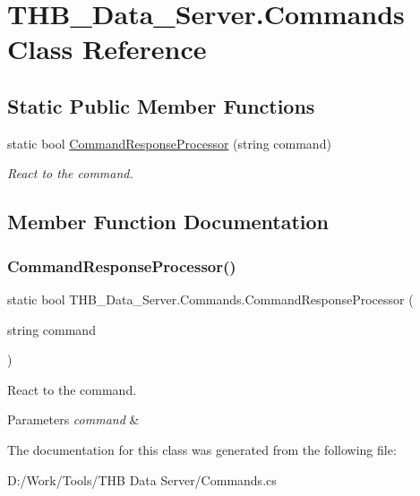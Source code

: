 \hypertarget{class_t_h_b___data___server_1_1_commands}{}\section{T\+H\+B\+\_\+\+Data\+\_\+\+Server.\+Commands Class Reference}
\label{class_t_h_b___data___server_1_1_commands}
\subsection*{Static Public Member Functions}
\begin{DoxyCompactItemize}
\item 
static bool \mbox{\hyperlink{class_t_h_b___data___server_1_1_commands_a996531160e55feb986342fac81c89d71}{Command\+Response\+Processor}} (string command)
\begin{DoxyCompactList}\small\item\em React to the command. \end{DoxyCompactList}\end{DoxyCompactItemize}


\subsection{Member Function Documentation}
\mbox{\label{class_t_h_b___data___server_1_1_commands_a996531160e55feb986342fac81c89d71}} 
\subsubsection{\texorpdfstring{Command\+Response\+Processor()}{CommandResponseProcessor()}}
{\footnotesize\ttfamily static bool T\+H\+B\+\_\+\+Data\+\_\+\+Server.\+Commands.\+Command\+Response\+Processor (\begin{DoxyParamCaption}\item[{string}]{command }\end{DoxyParamCaption})\hspace{0.3cm}{\ttfamily [static]}}



React to the command. 


\begin{DoxyParams}{Parameters}
{\em command} & \\
\hline
\end{DoxyParams}


The documentation for this class was generated from the following file\+:\begin{DoxyCompactItemize}
\item 
D\+:/\+Work/\+Tools/\+T\+H\+B Data Server/Commands.\+cs\end{DoxyCompactItemize}
